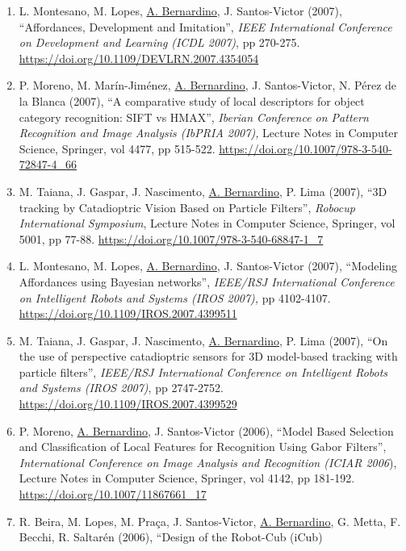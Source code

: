 \documentclass[
]{article}
\begin{document}
\begin{enumerate}
  ``Sample-Based 3D Tracking of Colored Objects : A Flexible
  Architecture'', \emph{British Machine Vision Conference (BMVC 2008)},
  pp 1-10. \url{https://doi.org/10.5244/C.22.82}~
\item
  L. Montesano, M. Lopes, \ul{A. Bernardino}, J. Santos-Victor (2007),
  ``Affordances, Development and Imitation'', \emph{IEEE International
  Conference on Development and Learning} \emph{(ICDL 2007)}, pp
  270-275. \url{https://doi.org/10.1109/DEVLRN.2007.4354054}~~
\item
  P. Moreno, M. Marín-Jiménez, \ul{A. Bernardino}, J. Santos-Victor, N.
  Pérez de la Blanca (2007), ``A comparative study of local descriptors
  for object category recognition: SIFT vs HMAX'', \emph{Iberian
  Conference on Pattern Recognition and Image Analysis (IbPRIA 2007),}
  Lecture Notes in Computer Science, Springer, vol 4477, pp 515-522.
  \url{https://doi.org/10.1007/978-3-540-72847-4_66}~
\item
  M. Taiana, J. Gaspar, J. Nascimento, \ul{A. Bernardino}, P. Lima
  (2007), ``3D tracking by Catadioptric Vision Based on Particle
  Filters'', \emph{Robocup International Symposium}, Lecture Notes in
  Computer Science, Springer, vol 5001, pp 77-88.
  \url{https://doi.org/10.1007/978-3-540-68847-1_7}~
\item
  L. Montesano, M. Lopes, \ul{A. Bernardino}, J. Santos-Victor (2007),
  ``Modeling Affordances using Bayesian networks'', \emph{IEEE/RSJ
  International Conference on Intelligent Robots and Systems (IROS
  2007),} pp 4102-4107. \url{https://doi.org/10.1109/IROS.2007.4399511}~
\item
  M. Taiana, J. Gaspar, J. Nascimento, \ul{A. Bernardino}, P. Lima
  (2007), ``On the use of perspective catadioptric sensors for 3D
  model-based tracking with particle filters'', \emph{IEEE/RSJ
  International Conference on Intelligent Robots and Systems (IROS
  2007)}, pp 2747-2752. \url{https://doi.org/10.1109/IROS.2007.4399529}
  ~
\item
  P. Moreno, \ul{A. Bernardino}, J. Santos-Victor (2006), ``Model Based
  Selection and Classification of Local Features for Recognition Using
  Gabor Filters'', \emph{International Conference on Image Analysis and
  Recognition (ICIAR 2006}), Lecture Notes in Computer Science,
  Springer, vol 4142, pp 181-192.
  \url{https://doi.org/10.1007/11867661_17}~
\item
  R. Beira, M. Lopes, M. Praça, J. Santos-Victor, \ul{A. Bernardino}, G.
  Metta, F. Becchi, R. Saltarén (2006), ``Design of the Robot-Cub (iCub)

\end{enumerate}
\end{document}
